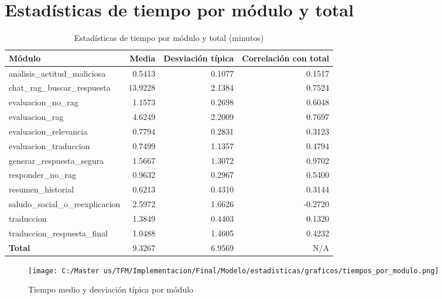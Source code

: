 \documentclass{article}
\begin{document}
\section*{Estadísticas de tiempo por módulo y total}

\begin{table}[H]
\centering
\caption{Estadísticas de tiempo por módulo y total (minutos)}
\begin{tabularx}{\textwidth}{lRRR}
\toprule
\textbf{Módulo} & \textbf{Media} & \textbf{Desviación típica} & \textbf{Correlación con total} \\
\midrule
analisis\_actitud\_maliciosa & 0.5413 & 0.1077 & 0.1517 \\
chat\_rag\_buscar\_respuesta & 13.9228 & 2.1384 & 0.7524 \\
evaluacion\_no\_rag & 1.1573 & 0.2698 & 0.6048 \\
evaluacion\_rag & 4.6249 & 2.2009 & 0.7697 \\
evaluacion\_relevancia & 0.7794 & 0.2831 & 0.3123 \\
evaluacion\_traduccion & 0.7499 & 1.1357 & 0.4794 \\
generar\_respuesta\_segura & 1.5667 & 1.3072 & 0.9702 \\
responder\_no\_rag & 0.9632 & 0.2967 & 0.5400 \\
resumen\_historial & 0.6213 & 0.4310 & 0.3144 \\
saludo\_social\_o\_reexplicacion & 2.5972 & 1.6626 & -0.2720 \\
traduccion & 1.3849 & 0.4403 & 0.1320 \\
traduccion\_respuesta\_final & 1.0488 & 1.4605 & 0.4232 \\
\midrule
\textbf{Total} & 9.3267 & 6.9569 & N/A \\
\bottomrule
\end{tabularx}
\end{table}

\begin{figure}[H]
\centering
\texttt{[image: C:/Master us/TFM/Implementacion/Final/Modelo/estadisticas/graficos/tiempos\_por\_modulo.png]}
\caption{Tiempo medio y desviación típica por módulo}
\end{figure}
\end{document}
